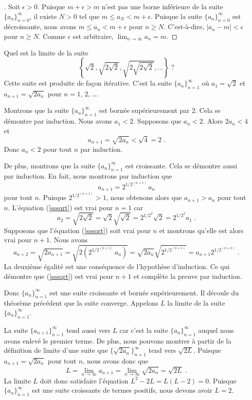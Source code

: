 {\begin{proof}[\theory]
Soit $\epsilon >0$.  Puisque $m+\epsilon > m$ n'est pas une borne
inférieure de la suite $\displaystyle \{ a_n \}_{n=0}^\infty$, il
existe $N>0$ tel que $m \leq a_N < m+\epsilon$.  Puisque la suite
$\displaystyle \{ a_n \}_{n=0}^\infty$ est décroissante, nous avons
$m \leq a_n < m+\epsilon$ pour $n\geq N$.  C'est-à-dire,
$|a_n-m|<\epsilon$ pour $n\geq N$.  Comme $\epsilon$ est arbitraire,
$\displaystyle \lim_{n\to \infty} a_n = m$.
\end{proof}

\begin{egg}[\theory]
Quel est la limite de la suite
\[
\left\{ \sqrt{2}, \sqrt{2\sqrt{2}}, \sqrt{2\sqrt{2\sqrt{2}}}, \ldots
\right\} \; ?
\]
Cette suite est produite de façon itérative. C'est la suite
$\{a_n\}_{n=1}^\infty$ où $a_1=\sqrt{2}$ et $a_{n+1} = \sqrt{2a_n}$
pour $n=1$, $2$, \ldots.

Montrons que la suite $\{a_n\}_{n=1}^\infty$ est bornée
supérieurement par $2$.  Cela se démontre par induction.  Nous avons
$a_1<2$.  Supposons que $a_n < 2$.  Alors $2a_n < 4$ et
\[
a_{n+1} = \sqrt{2a_n} < \sqrt{4} = 2 \; .
\]
Donc $a_n <2$ pour tout $n$ par induction.

De plus, montrons que la suite $\{a_n\}_{n=1}^\infty$ est
croissante.   Cela se démontre aussi par induction.  En fait, nous  montrons
par induction que
\begin{equation}\label{sssqrt}
a_{n+1} = 2^{1/2^{(n+1)}}\,a_n
\end{equation}
pour tout $n$.  Puisque $2^{1/2^{(n+1)}} > 1$, nous obtenons alors que
$a_{n+1} > a_n$ pour tout $n$.  L'équation (\ref{sssqrt}) est vrai
pour $n=1$ car
\[
a_2 = \sqrt{2 \sqrt{2}} = \sqrt{2} \sqrt{\sqrt{2}} =
2^{1/2^2} \sqrt{2} = 2^{1/2^2} a_1 \; .
\]
Supposons que l'équation (\ref{sssqrt}) soit vrai pour $n$ et
montrons qu'elle est alors vrai pour $n+1$.  Nous avons
\[
a_{n+2} = \sqrt{2a_{n+1}} = \sqrt{2 \left(2^{1/2^{(n+1)}} \, a_n\right)}
= \sqrt{2 a_n} \sqrt{2^{1/2^{(n+1)}}}
= a_{n+1} 2^{1/2^{(n+2)}} \; .
\]
La deuxième égalité est une conséquence de l'hypothèse d'induction.
Ce qui démontre que (\ref{sssqrt}) est vrai pour $n+1$ et complète
la preuve par induction.

Donc $\{a_n\}_{n=1}^\infty$ est une suite croissante et
bornée supérieurement.  Il découle du théorème précédent que la suite
converge. Appelons $L$ la limite de la suite $\{a_n\}_{n=1}^\infty$.

La suite $\{ a_{n+1} \}_{n=1}^\infty$ tend aussi vers $L$ car c'est la
suite $\{ a_n\}_{n=1}^\infty$ auquel nous avons enlevé le premier terme.  De
plus, nous pouvons montrer à partir de la définition de limite d'une suite
que $\{ \sqrt{2a_n} \}_{n=1}^\infty$ tend vers $\sqrt{2L}$.  Puisque
$a_{n+1} = \sqrt{2 a_n}$ pour tout $n$, nous avons donc que
\[
L= \lim_{n\rightarrow \infty} a_{n+1} =
\lim_{n\rightarrow \infty} \sqrt{2 a_n} = \sqrt{2L} \; .
\]
La limite $L$ doit donc satisfaire l'équation $L^2-2L = L(L-2) = 0$.
Puisque $\{ a_n \}_{n=1}^\infty$ est une suite croissante de termes
positifs, nous devons avoir $L=2$.
\end{egg}

}
